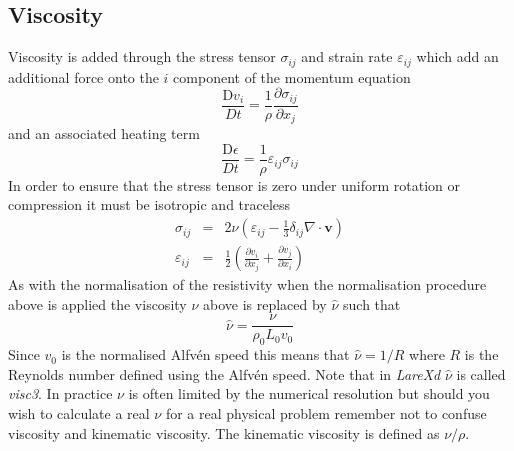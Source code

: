 \documentclass[11pt]{article}
\begin{document}
\subsection{Viscosity}
Viscosity is added through the stress tensor $\sigma_{ij}$ and strain rate $\varepsilon_{ij}$ which add an additional force onto the $i$ component of the momentum equation
\begin{displaymath}
\frac{\mathrm{D}v_i}{Dt}=\frac{1}{\rho}\frac{\partial \sigma_{ij}}{\partial x_j}
\end{displaymath}
and an associated heating term 
\begin{displaymath}
\frac{\mathrm{D}\epsilon}{Dt}=\frac{1}{\rho}\varepsilon_{ij}\sigma_{ij}
\end{displaymath}
In order to ensure that the stress tensor is zero under uniform rotation or compression it must be isotropic and traceless
\begin{eqnarray*}
\sigma_{ij} &=& 2 \nu \left(\varepsilon_{ij}-\frac{1}{3}\delta_{ij}\nabla\cdot\mathbf{v}\right) \\
\varepsilon_{ij} &=& \frac{1}{2}\left(\frac{\partial v_i}{\partial x_j} + \frac{\partial v_j}{\partial x_i} \right)
\end{eqnarray*}
As with the normalisation of the resistivity when the normalisation procedure above is applied the viscosity $\nu$ above is replaced by $\hat{\nu}$ such that
\begin{displaymath}
 \hat{\nu}=\frac{\nu}{\rho_0 L_0 v_0}
\end{displaymath}
Since $v_0$ is the normalised Alfv\'en speed this means that $\hat{\nu}=1/R$ where $R$ is the Reynolds number defined using the Alfv\'en speed. Note that in {\it LareXd}  $\hat{\nu}$ is called {\it visc3}. In practice $\nu$ is often limited by the numerical resolution but should you wish to calculate a real $\nu$ for a real physical problem remember not to confuse viscosity and kinematic viscosity. The kinematic viscosity is defined as $\nu/\rho$. 
\end{document}
